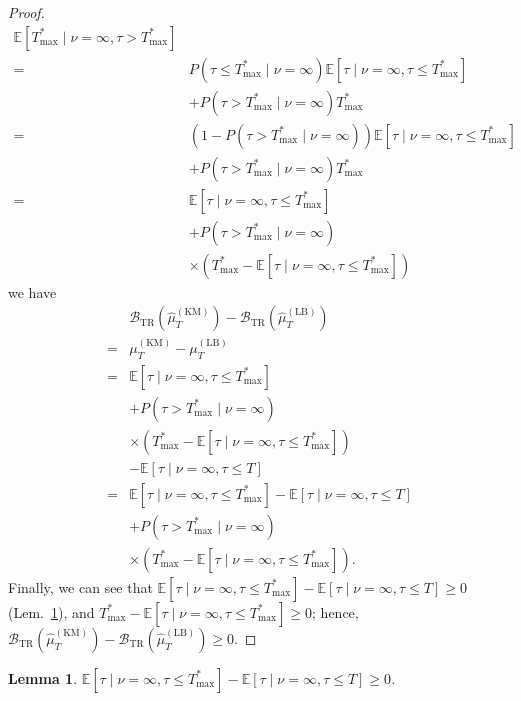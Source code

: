\documentclass{article}
\theoremstyle{plain}
\newtheorem{lemma}[theorem]{Lemma}
\theoremstyle{definition}
\theoremstyle{remark}
\def\nn{\nonumber \\ }
\def\mbe{\mathbb{E}}
\begin{document}
\begin{proof}
\begin{align}
            \mbe[ T_\mathrm{max}^*  \mid \nu = \infty, \tau > T_\mathrm{max}^*] \\
        =& P(\tau \leq T_\mathrm{max}^* \mid \nu=\infty) 
            \mbe[ \tau \mid \nu=\infty, \tau \leq T_\mathrm{max}^*] \nn
            &+  P(\tau > T_\mathrm{max}^* \mid \nu=\infty) 
            T_\mathrm{max}^*  \\
        =& (1 - P(\tau > T_\mathrm{max}^* \mid \nu=\infty)) 
            \mbe[ \tau \mid \nu=\infty, \tau \leq T_\mathrm{max}^*] \nn
            &+  P(\tau > T_\mathrm{max}^* \mid \nu=\infty) 
            T_\mathrm{max}^* \\
        =& \mbe[ \tau \mid \nu=\infty, \tau \leq T_\mathrm{max}^*] \nn
            &+  P(\tau > T_\mathrm{max}^* \mid \nu=\infty) \nn
            &\times (T_\mathrm{max}^* - \mbe[ \tau \mid \nu=\infty, \tau \leq T_\mathrm{max}^*])
    \end{align}
    we have 
    \begin{align}
        &\mathcal{B}_\mathrm{TR}(\hat{\mu}_T^\mathrm{(KM)}) - \mathcal{B}_\mathrm{TR}(\hat{\mu}_T^\mathrm{(LB)}) \nn
        =&  \mu_T^{\mathrm{(KM)}}  - \mu_T^{\mathrm{(LB)}} \\
        =& \mbe[ \tau \mid \nu=\infty, \tau \leq T_\mathrm{max}^*] \nn
            &+  P(\tau > T_\mathrm{max}^* \mid \nu=\infty) \nn
            &\times (T_\mathrm{max}^* - \mbe[ \tau \mid \nu=\infty, \tau \leq T_\mathrm{max}^*]) \nn
            &- \mbe[\tau \mid \nu=\infty, \tau \leq T] \\
        =& \mbe[ \tau \mid \nu=\infty, \tau \leq T_\mathrm{max}^*] - \mbe[\tau \mid \nu=\infty, \tau \leq T] \nn
            &+  P(\tau > T_\mathrm{max}^* \mid \nu=\infty) \nn
            &\times (T_\mathrm{max}^* - \mbe[ \tau \mid \nu=\infty, \tau \leq T_\mathrm{max}^*]). 
    \end{align}
        Finally, we can see that 
        $\mbe[ \tau \mid \nu=\infty, \tau \leq T_\mathrm{max}^*] - \mbe[\tau \mid \nu=\infty, \tau \leq T] \geq 0$ (Lem.~\ref{lem:ARL_last_inequality}), and
        $T_\mathrm{max}^* - \mbe[ \tau \mid \nu=\infty, \tau \leq T_\mathrm{max}^*] \geq 0$;
        hence, $\mathcal{B}_\mathrm{TR}(\hat{\mu}_T^\mathrm{(KM)}) - \mathcal{B}_\mathrm{TR}(\hat{\mu}_T^\mathrm{(LB)}) \geq 0$.
    \end{proof}

\begin{lemma} \label{lem:ARL_last_inequality}
    $\mbe[ \tau \mid \nu=\infty, \tau \leq T_\mathrm{max}^*] - \mbe[\tau \mid \nu=\infty, \tau \leq T] \geq 0$.
\end{lemma}
\end{document}
